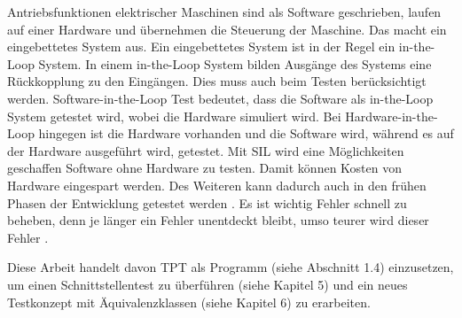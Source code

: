 Antriebsfunktionen elektrischer Maschinen sind als Software geschrieben, laufen auf einer 
Hardware und übernehmen die Steuerung der Maschine. Das macht ein eingebettetes System aus.
Ein eingebettetes System ist in der Regel ein in-the-Loop System. In einem in-the-Loop System bilden Ausgänge des Systems
eine Rückkopplung zu den Eingängen. Dies muss auch beim Testen berücksichtigt werden.
Software-in-the-Loop Test bedeutet, dass die Software als in-the-Loop System getestet wird, wobei die Hardware
simuliert wird. Bei Hardware-in-the-Loop hingegen ist die Hardware vorhanden und die Software wird, während
es auf der Hardware ausgeführt wird, getestet.
Mit SIL wird eine Möglichkeiten geschaffen Software ohne Hardware zu testen. Damit können Kosten von Hardware eingespart werden.
Des Weiteren kann dadurch auch in den frühen Phasen der Entwicklung getestet werden \cite[vgl.][S. 1 f.]{silest}\cite[vgl.][]{hilwikipedia}. Es ist wichtig Fehler schnell zu beheben,
denn je länger ein Fehler unentdeckt bleibt, umso teurer wird dieser Fehler \cite[vgl.][]{fehler}.

Diese Arbeit handelt davon TPT als Programm (siehe Abschnitt 1.4) einzusetzen, um einen Schnittstellentest zu überführen (siehe Kapitel 5) und ein
neues Testkonzept mit Äquivalenzklassen (siehe Kapitel 6) zu erarbeiten.






